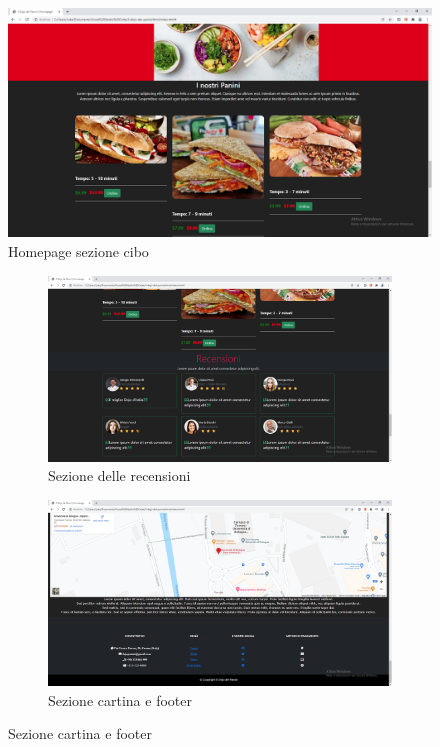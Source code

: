 \documentclass[a4paper,12pt]{report}
\begin{document}
	\begin{figure}[H] 
		\centering
		\includegraphics[width=1\textwidth, height=1\textheight, keepaspectratio]{./Images/Homepage_food.png}
		\caption{Homepage sezione cibo}
		\label{fig:homepage_cibo}
	\end{figure}

	\begin{figure}[H]
		\begin{subfigure}{.6\textwidth}
			\centering
			\includegraphics[width=1\linewidth]{./Images/Homepage_recensioni.png}
			\caption{Sezione delle recensioni}
			\label{fig:homepage_recensioni}
		\end{subfigure}
		\begin{subfigure}{.6\textwidth}
			\centering
			\includegraphics[width=1\linewidth]{./Images/Homepage_cartina_e_footer.png}
			\caption{Sezione cartina e footer}
			\label{fig:homepage_footer}
		\end{subfigure}
		\label{fig:homepages}
	\end{figure}
\end{document}
